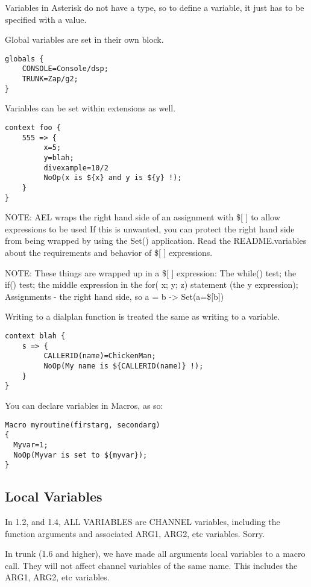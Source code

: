 {Variables in Asterisk do not have a type, so to define a variable, it
just has to be specified with a value.

Global variables are set in their own block.

\begin{verbatim}
globals {
    CONSOLE=Console/dsp;
    TRUNK=Zap/g2;
}
\end{verbatim}


Variables can be set within extensions as well.

\begin{verbatim}
context foo {
    555 => {
         x=5;
         y=blah;
         divexample=10/2
         NoOp(x is ${x} and y is ${y} !);
    }
}
\end{verbatim}

NOTE: AEL wraps the right hand side of an assignment with \$[ ] to allow 
expressions to be used If this is unwanted, you can protect the right hand 
side from being wrapped by using the Set() application. 
Read the README.variables about the requirements and behavior 
of \$[ ] expressions.

NOTE: These things are wrapped up in a \$[ ] expression: The while() test; 
the if() test; the middle expression in the for( x; y; z) statement 
(the y expression); Assignments - the right hand side, so a = b -> Set(a=\$[b])

Writing to a dialplan function is treated the same as writing to a variable.

\begin{verbatim}
context blah {
    s => {
         CALLERID(name)=ChickenMan;
         NoOp(My name is ${CALLERID(name)} !);
    }
} 
\end{verbatim}

You can declare variables in Macros, as so:

\begin{verbatim}
Macro myroutine(firstarg, secondarg)
{
  Myvar=1;
  NoOp(Myvar is set to ${myvar});
}
\end{verbatim}

\subsection{Local Variables}

In 1.2, and 1.4, ALL VARIABLES are CHANNEL variables, including the function
arguments and associated ARG1, ARG2, etc variables. Sorry.

In trunk (1.6 and higher), we have made all arguments local variables to
a macro call. They will not affect channel variables of the same name.
This includes the ARG1, ARG2, etc variables. 

}
